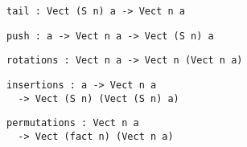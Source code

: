 \begin{frame}[fragile]

\begin{lstlisting}[frame=single]
tail : Vect (S n) a -> Vect n a
\end{lstlisting}
\begin{lstlisting}[frame=single]
push : a -> Vect n a -> Vect (S n) a
\end{lstlisting}
\begin{lstlisting}[frame=single]
rotations : Vect n a -> Vect n (Vect n a)
\end{lstlisting}
\begin{lstlisting}[frame=single]
insertions : a -> Vect n a
  -> Vect (S n) (Vect (S n) a)
\end{lstlisting}
\begin{lstlisting}[frame=single]
permutations : Vect n a
  -> Vect (fact n) (Vect n a)
\end{lstlisting}

\end{frame}
